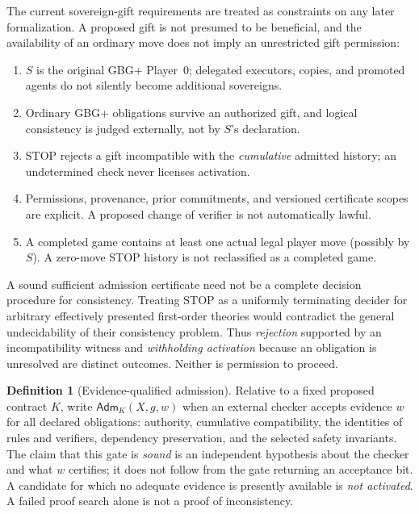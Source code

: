 \documentclass[11pt,letterpaper]{article}
\theoremstyle{definition}\newtheorem{definition}[theorem]{Definition}\newtheorem{example}[theorem]{Example}
\theoremstyle{remark}\newtheorem{remark}[theorem]{Remark}
\newcommand{\Adm}{\mathsf{Adm}}
\begin{document}
The current sovereign-gift requirements are treated as constraints on any later formalization. A proposed gift is not presumed to be beneficial, and the availability of an ordinary move does not imply an unrestricted gift permission:
\begin{enumerate}
\item $S$ is the original GBG+ Player~0; delegated executors, copies, and promoted agents do not silently become additional sovereigns.
\item Ordinary GBG+ obligations survive an authorized gift, and logical consistency is judged externally, not by $S$'s declaration.
\item STOP rejects a gift incompatible with the \emph{cumulative} admitted history; an undetermined check never licenses activation.
\item Permissions, provenance, prior commitments, and versioned certificate scopes are explicit. A proposed change of verifier is not automatically lawful.
\item A completed game contains at least one actual legal player move (possibly by $S$). A zero-move STOP history is not reclassified as a completed game.
\end{enumerate}
A sound sufficient admission certificate need not be a complete decision procedure for consistency. Treating STOP as a uniformly terminating decider for arbitrary effectively presented first-order theories would contradict the general undecidability of their consistency problem. Thus \emph{rejection} supported by an incompatibility witness and \emph{withholding activation} because an obligation is unresolved are distinct outcomes. Neither is permission to proceed.

\begin{definition}[Evidence-qualified admission]\label{mvsi:def:admit}
Relative to a fixed proposed contract $K$, write $\Adm_K(X,g,w)$ when an external checker accepts evidence $w$ for all declared obligations: authority, cumulative compatibility, the identities of rules and verifiers, dependency preservation, and the selected safety invariants. The claim that this gate is \emph{sound} is an independent hypothesis about the checker and what $w$ certifies; it does not follow from the gate returning an acceptance bit. A candidate for which no adequate evidence is presently available is \emph{not activated}. A failed proof search alone is not a proof of inconsistency.
\end{definition}
\end{document}
